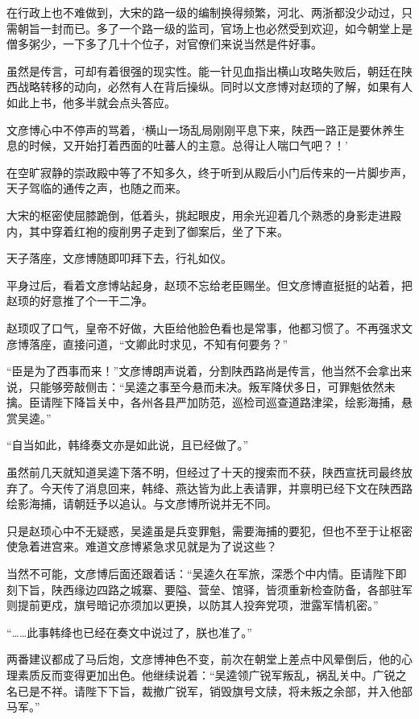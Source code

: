 在行政上也不难做到，大宋的路一级的编制换得频繁，河北、两浙都没少动过，只需朝旨一封而已。多了一个路一级的监司，官场上也必然受到欢迎，如今朝堂上是僧多粥少，一下多了几十个位子，对官僚们来说当然是件好事。

虽然是传言，可却有着很强的现实性。能一针见血指出横山攻略失败后，朝廷在陕西战略转移的动向，必然有人在背后操纵。同时以文彦博对赵顼的了解，如果有人如此上书，他多半就会点头答应。

文彦博心中不停声的骂着，‘横山一场乱局刚刚平息下来，陕西一路正是要休养生息的时候，又开始打着西面的吐蕃人的主意。总得让人喘口气吧？！’

在空旷寂静的崇政殿中等了不知多久，终于听到从殿后小门后传来的一片脚步声，天子驾临的通传之声，也随之而来。

大宋的枢密使屈膝跪倒，低着头，挑起眼皮，用余光迎着几个熟悉的身影走进殿内，其中穿着红袍的瘦削男子走到了御案后，坐了下来。

天子落座，文彦博随即叩拜下去，行礼如仪。

平身过后，看着文彦博站起身，赵顼不忘给老臣赐坐。但文彦博直挺挺的站着，把赵顼的好意推了个一干二净。

赵顼叹了口气，皇帝不好做，大臣给他脸色看也是常事，他都习惯了。不再强求文彦博落座，直接问道，“文卿此时求见，不知有何要务？”

“臣是为了西事而来！”文彦博朗声说着，分割陕西路尚是传言，他当然不会拿出来说，只能够旁敲侧击：“吴逵之事至今悬而未决。叛军降伏多日，可罪魁依然未擒。臣请陛下降旨关中，各州各县严加防范，巡检司巡查道路津梁，绘影海捕，悬赏吴逵。”

“自当如此，韩绛奏文亦是如此说，且已经做了。”

虽然前几天就知道吴逵下落不明，但经过了十天的搜索而不获，陕西宣抚司最终放弃了。今天传了消息回来，韩绛、燕达皆为此上表请罪，并禀明已经下文在陕西路绘影海捕，请朝廷予以追认。与文彦博所说并无不同。

只是赵顼心中不无疑惑，吴逵虽是兵变罪魁，需要海捕的要犯，但也不至于让枢密使急着进宫来。难道文彦博紧急求见就是为了说这些？

当然不可能，文彦博后面还跟着话：“吴逵久在军旅，深悉个中内情。臣请陛下即刻下旨，陕西缘边四路之城寨、要隘、营垒、馆驿，皆须重新检查防备，各部驻军则提前更戍，旗号暗记亦须加以更换，以防其人投奔党项，泄露军情机密。”

“……此事韩绛也已经在奏文中说过了，朕也准了。”

两番建议都成了马后炮，文彦博神色不变，前次在朝堂上差点中风晕倒后，他的心理素质反而变得更加出色。他继续说着：“吴逵领广锐军叛乱，祸乱关中。广锐之名已是不祥。请陛下下旨，裁撤广锐军，销毁旗号文牍，将未叛之余部，并入他部马军。”

